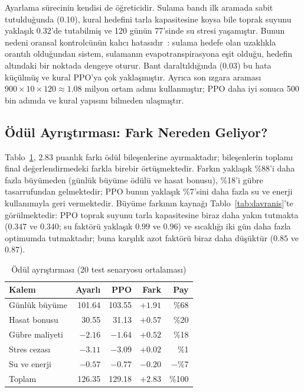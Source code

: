 \documentclass[conference,a4paper]{IEEEtran}
\begin{document}
Ayarlama sürecinin kendisi de öğreticidir. Sulama bandı ilk aramada sabit tutulduğunda (0.10), kural hedefini tarla kapasitesine koysa bile toprak suyunu yaklaşık $0.32$'de tutabilmiş ve 120 günün 77'sinde su stresi yaşamıştır. Bunun nedeni oransal kontrolcünün kalıcı hatasıdır~\cite{astrom2006}: sulama hedefe olan uzaklıkla orantılı olduğundan sistem, sulamanın evapotranspirasyona eşit olduğu, hedefin altındaki bir noktada dengeye oturur. Bant daraltıldığında (0.03) bu hata küçülmüş ve kural PPO'ya çok yaklaşmıştır. Ayrıca son ızgara araması $900\times10\times120\approx1.08$ milyon ortam adımı kullanmıştır; PPO daha iyi sonuca 500 bin adımda ve kural yapısını bilmeden ulaşmıştır.

\subsection{Ödül Ayrıştırması: Fark Nereden Geliyor?}
Tablo~\ref{tab:ayrisma}, $2.83$ puanlık farkı ödül bileşenlerine ayırmaktadır; bileşenlerin toplamı final değerlendirmedeki farkla birebir örtüşmektedir. Farkın yaklaşık \%88'i daha fazla büyümeden (günlük büyüme ödülü ve hasat bonusu), \%18'i gübre tasarrufundan gelmektedir; PPO bunun yaklaşık \%7'sini daha fazla su ve enerji kullanımıyla geri vermektedir. Büyüme farkının kaynağı Tablo~\ref{tab:davranis}'te görülmektedir: PPO toprak suyunu tarla kapasitesine biraz daha yakın tutmakta ($0.347$ ve $0.340$; su faktörü yaklaşık $0.99$ ve $0.96$) ve sıcaklığı iki gün daha fazla optimumda tutmaktadır; buna karşılık azot faktörü biraz daha düşüktür ($0.85$ ve $0.87$).

\begin{table}[!t]
\caption{Ödül ayrıştırması (20 test senaryosu ortalaması)}
\label{tab:ayrisma}
\centering
\footnotesize
\begin{tabular}{@{}lrrrr@{}}
\toprule
Kalem & Ayarlı & PPO & Fark & Pay\\
\midrule
Günlük büyüme & 101.64 & 103.55 & $+1.91$ & \%68\\
Hasat bonusu & 30.55 & 31.13 & $+0.57$ & \%20\\
Gübre maliyeti & $-2.16$ & $-1.64$ & $+0.52$ & \%18\\
Stres cezası & $-3.11$ & $-3.09$ & $+0.02$ & \%1\\
Su ve enerji & $-0.57$ & $-0.77$ & $-0.20$ & $-$\%7\\
\midrule
Toplam & 126.35 & 129.18 & $+2.83$ & \%100\\
\bottomrule
\end{tabular}
\end{table}
\end{document}
